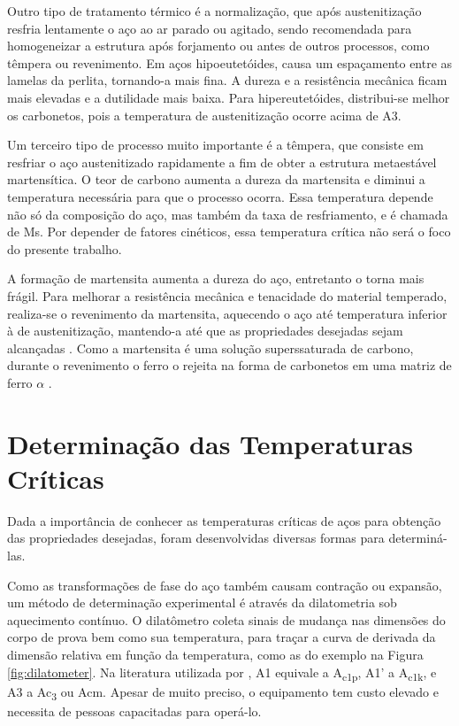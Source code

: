 \documentclass[brazil,tese,epusp]{usp}
\begin{document}
Outro tipo de tratamento térmico é a normalização, que após austenitização resfria lentamente o aço ao ar parado ou agitado, sendo recomendada para homogeneizar a estrutura após forjamento ou antes de outros processos, como têmpera ou revenimento. Em aços hipoeutetóides, causa um espaçamento entre as lamelas da perlita, tornando-a mais fina. A dureza e a resistência mecânica ficam mais elevadas e a dutilidade mais baixa. Para hipereutetóides, distribui-se melhor os carbonetos, pois a temperatura de austenitização ocorre acima de A3.

Um terceiro tipo de processo muito importante é a têmpera, que consiste em resfriar o aço austenitizado rapidamente a fim de obter a estrutura metaestável martensítica. O teor de carbono aumenta a dureza da martensita e diminui a temperatura necessária para que o processo ocorra. Essa temperatura depende não só da composição do aço, mas também da taxa de resfriamento, e é chamada de Ms. Por depender de fatores cinéticos, essa temperatura crítica não será o foco do presente trabalho.

A formação de martensita aumenta a dureza do aço, entretanto o torna mais frágil. Para  melhorar a resistência mecânica e tenacidade do material temperado, realiza-se o revenimento da martensita, aquecendo o aço até temperatura inferior à de austenitização, mantendo-a até que as propriedades desejadas sejam alcançadas \cite{Silva2010}. Como a martensita é uma solução superssaturada de carbono, durante o revenimento o ferro o rejeita na forma de carbonetos em uma matriz de ferro $\alpha$ \cite{Honeycombe1982}.


\section{Determinação das Temperaturas Críticas}

Dada a importância de conhecer as temperaturas críticas de aços para obtenção das propriedades desejadas, foram desenvolvidas diversas formas para determiná-las.

Como as transformações de fase do aço também causam contração ou expansão, um método de determinação experimental é através da dilatometria sob aquecimento contínuo. O dilatômetro coleta sinais de mudança nas dimensões do corpo de prova bem como sua temperatura, para traçar a curva de derivada da dimensão relativa em função da temperatura, como as do exemplo na Figura \ref{fig:dilatometer}. Na literatura utilizada por , A1 equivale a A\textsubscript{c1p}, A1' a A\textsubscript{c1k}, e A3 a Ac\textsubscript{3} ou Acm. Apesar de muito preciso, o equipamento tem custo elevado e necessita de pessoas capacitadas para operá-lo.
\end{document}
